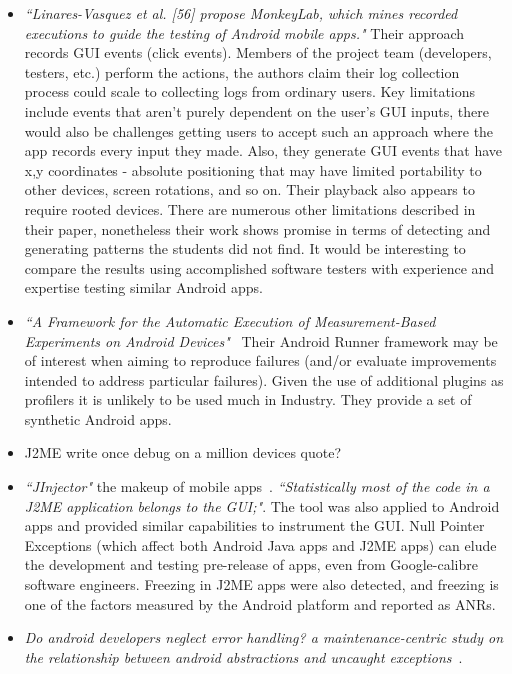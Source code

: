 \begin{itemize}
    \item \emph{``Linares-Vasquez et al. [56] propose MonkeyLab, which mines recorded executions to guide the testing of Android mobile apps."} Their approach records GUI events (click events). Members of the project team (developers, testers, etc.) perform the actions, the authors claim their log collection process could scale to collecting logs from ordinary users. Key limitations include events that aren't purely dependent on the user's GUI inputs, there would also be challenges getting users to accept such an approach where the app records every input they made. Also, they generate GUI events that have x,y coordinates - absolute positioning that may have limited portability to other devices, screen rotations, and so on. Their playback also appears to require rooted devices. There are numerous other limitations described in their paper, nonetheless their work shows promise in terms of detecting and generating patterns the students did not find. It would be interesting to compare the results using accomplished software testers with experience and expertise testing similar Android apps.
    
    \item \emph{``A Framework for the Automatic Execution of Measurement-Based Experiments on Android Devices"}~\cite{malavolta2020_android_runner} Their Android Runner framework may be of interest when aiming to reproduce failures (and/or evaluate improvements intended to address particular failures). Given the use of additional plugins as profilers it is unlikely to be used much in Industry. They provide a set of synthetic Android apps. %
    
    \item J2ME write once debug on a million devices quote?

    \item \emph{``JInjector"} the makeup of mobile apps~\cite{sama2009using_jinjector}. \emph{``Statistically most of the code in a J2ME application belongs to the GUI;"}. The tool was also applied to Android apps and provided similar capabilities to instrument the GUI. Null Pointer Exceptions (which affect both Android Java apps and J2ME apps) can elude the development and testing pre-release of apps, even from Google-calibre software engineers. Freezing in J2ME apps were also detected, and freezing is one of the factors measured by the Android platform and reported as ANRs.
    \item \emph{Do android developers neglect error handling? a maintenance-centric study on the relationship between android abstractions and uncaught exceptions}~\cite{Oliveira_Borges_Silva_Cacho_Castor_2018_android_error_handling}.

\end{itemize}

